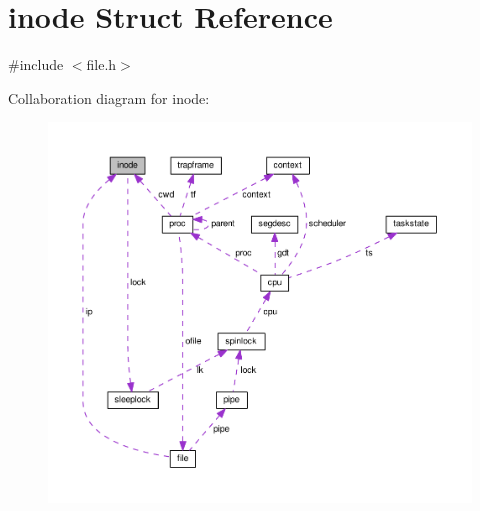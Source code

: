 \hypertarget{structinode}{}\section{inode Struct Reference}
\label{structinode}


{\ttfamily \#include $<$file.\+h$>$}



Collaboration diagram for inode\+:\nopagebreak
\begin{figure}[H]
\begin{center}
\leavevmode
\includegraphics[width=350pt]{d7/d2b/structinode__coll__graph}
\end{center}
\end{figure}
